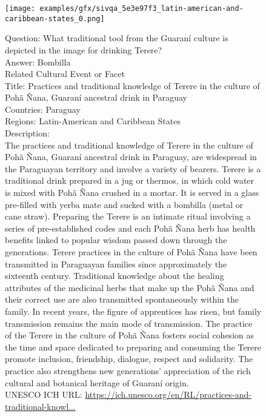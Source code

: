 \begin{figure}[H]
\begin{tcolorbox}[colback=gray!5!white,colframe=black!75!black,fonttitle=\bfseries\scriptsize,fontupper=\ttfamily\footnotesize,segmentation style={solid, black!30}]
  \begin{center}
    \begin{minipage}{0.5\linewidth}
      \centering
      \texttt{[image: examples/gfx/sivqa\_5e3e97f3\_latin-american-and-caribbean-states\_0.png]}
      {\captionsetup{labelformat=empty}}
    \end{minipage}\hfill
  \end{center}
  {\Large{Question:}} {\large{What traditional tool from the Guaraní culture is depicted in the image for drinking Terere?}}\\
  {\Large{Answer:}} {\large{Bombilla}}\\
   \tcbline
  {\Large{Related Cultural Event or Facet}}\\[4mm]
  {\normalsize{Title:}} {\normalsize{Practices and traditional knowledge of Terere in the culture of Pohã Ñana, Guaraní ancestral drink in Paraguay}}\\
  {\normalsize{Countries:}} Paraguay\\
  {\normalsize{Regions:}} Latin-American and Caribbean States\\
  {\normalsize{Description:}}\\
  The practices and traditional knowledge of Terere in the culture of Pohã Ñana, Guaraní ancestral drink in Paraguay, are widespread in the Paraguayan territory and involve a variety of bearers. Terere is a traditional drink prepared in a jug or thermos, in which cold water is mixed with Pohã Ñana crushed in a mortar. It is served in a glass pre-filled with yerba mate and sucked with a bombilla (metal or cane straw). Preparing the Terere is an intimate ritual involving a series of pre-established codes and each Pohã Ñana herb has health benefits linked to popular wisdom passed down through the generations. Terere practices in the culture of Pohã Ñana have been transmitted in Paraguayan families since approximately the sixteenth century. Traditional knowledge about the healing attributes of the medicinal herbs that make up the Pohã Ñana and their correct use are also transmitted spontaneously within the family. In recent years, the figure of apprentices has risen, but family transmission remains the main mode of transmission. The practice of the Terere in the culture of Pohã Ñana fosters social cohesion as the time and space dedicated to preparing and consuming the Terere promote inclusion, friendship, dialogue, respect and solidarity. The practice also strengthens new generations’ appreciation of the rich cultural and botanical heritage of Guaraní origin.\\[2mm]
  {\normalsize{UNESCO ICH URL:}} \href{https://ich.unesco.org/en/RL/practices-and-traditional-knowledge-of-terere-in-the-culture-of-poha-nana-guarani-ancestral-drink-in-paraguay-01603}{https://ich.unesco.org/en/RL/practices-and-traditional-knowl...}
\end{tcolorbox}
\end{figure}